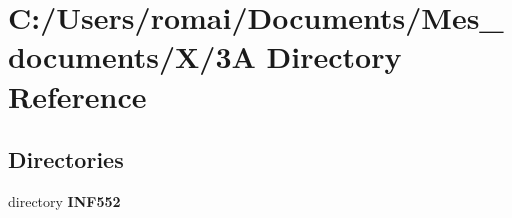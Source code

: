 \section{C\+:/\+Users/romai/\+Documents/\+Mes\+\_\+documents/\+X/3A Directory Reference}
\label{dir_781470135aa773d73f225b9d7994927c}
\subsection*{Directories}
\begin{DoxyCompactItemize}
\item 
directory \textbf{ I\+N\+F552}
\end{DoxyCompactItemize}

